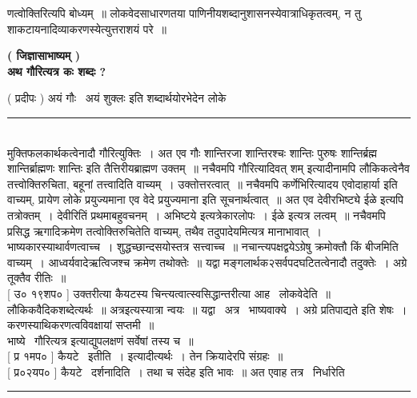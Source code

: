 \documentclass[11pt, openany]{book}
\begin{document}
\begin{multicols}{2}
\noindent
णत्वोक्तिरित्यपि बोध्यम्~॥ लोकवेदसाधारणतया पाणिनीयशब्दानुशासनस्येवात्राधिकृतत्वम्, न तु शाकटायनादिव्याकरणस्येत्युत्तराशयं परे~॥

\begin{center}
\textbf{ ( जिज्ञासाभाष्यम् ) }\\

\textbf{अथ गौरित्यत्र कः शब्दः ?}
\end{center}

 ( प्रदीपः ) अयं गौः \textendash\ अयं शुक्लः इति शब्दार्थयोरभेदेन लोके 

\noindent
\rule{1\linewidth}{0.5pt}\\

\noindent
मुक्तिफलकार्थकत्वेनादौ गौरित्युक्तिः~। अत एव {\qt गौः शान्तिरजा शान्तिरश्चः शान्तिः पुरुषः शान्तिर्ब्रह्म शान्तिर्ब्राह्मणः शान्तिः} इति तैत्तिरीयब्राह्मण उक्तम्~॥ नचैवमपि गौरित्यादिवत् शम् इत्यादीनामपि लौकिकत्वेनैव तत्त्वोक्तिरुचिता, बहूनां तत्त्वादिति वाच्यम्~। उक्तोत्तरत्वात्~॥ नचैवमपि कर्णेभिरित्यादय एवोदाहार्या इति वाच्यम्, प्रायेण लोके प्रयुज्यमाना एव वेदे प्रयुज्यमाना इति सूचनार्थत्वात्~॥ अत एव {\qt देवीरभिष्ट्ये ईळे} इत्यपि तत्रोक्तम्~। देवीरितिं प्रथमाबहुवचनम्~। अभिष्टये इत्यत्रेकारलोपः~। ईळे इत्यत्र लत्वम्~॥ नचैवमपि प्रसिद्ध ऋगादिक्रमेण तत्वोक्तिरुचितेति वाच्यम्, तथैव तदुपादेयमित्यत्र मानाभावात्~। भाष्यकारस्याथार्वणत्वाच्च~। शुद्धच्छान्दसयोस्तत्र सत्त्वाच्च~॥ नचान्त्यपक्षद्वयेऽग्रेषु क्रमोक्तौ किं बीजमिति वाच्यम्~। आध्वर्यवादेऋत्विजश्च क्रमेण तथोक्तेः~॥ यद्वा मङ्गलार्थक२सर्वपदघटितत्वेनादौ तदुक्तेः~। अग्रे तूक्तैव रीतिः~॥\\

 [ उ० १९शप० ] उक्तरीत्या कैयटस्य चिन्त्यत्वात्स्वसिद्धान्तरीत्या आह \textendash\ लोकवेदेति~॥ लौकिकवैदिकशब्देत्यर्थः~॥ अत्रइत्यस्यात्रा न्वयः~॥ यद्वा \textendash\ अत्र \textendash\ भाष्यवाक्ये~। अग्रे {\qt प्रतिपाद्यते} इति शेषः~। करणस्याथिकरणत्वविवक्षायां सप्तमी~॥\\

भाष्ये \textendash\ {\qt गौरित्यत्र} इत्याद्युपलक्षणं सर्वेषां तस्य च~॥\\ 

 [ प्र १मप० ] कैयटे \textendash\ इतीति~। इत्यादीत्यर्थः~। तेन क्रियादेरपि संग्रहः~॥\\

 [ प्र०२यप० ] कैयटे \textendash\ दर्शनादिति~। तथा च संदेह इति भावः~॥ अत एवाह तत्र \textendash\ निर्धारेति \textendash\ 

\noindent
\rule{1\linewidth}{0.5pt}\\


\end{multicols}
\end{document}
